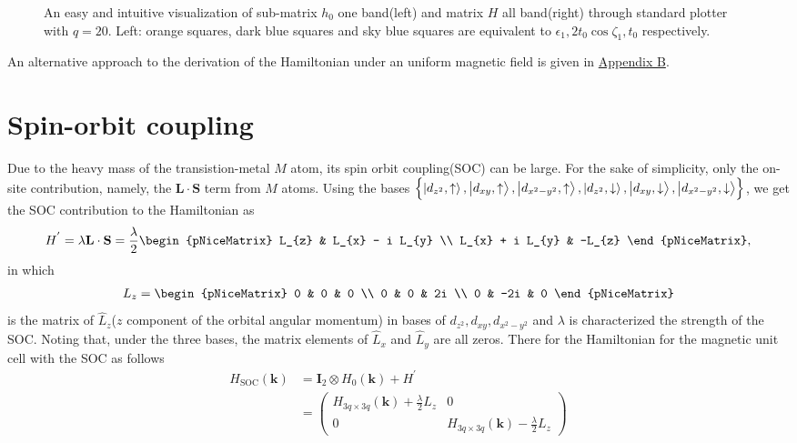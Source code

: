 \documentclass{report}
\newcommand{\f}[2]{\dfrac{#1}{#2}}
\begin{document}
\begin{figure}[htb]
\begin{subfigure}[b]{0.496\textwidth}
		\label{fig:1 band matrix}
	\end{subfigure}
	\caption{
		An easy and intuitive visualization of sub-matrix $h_{0}$ one band(left) and matrix $H$ all band(right) through standard plotter with $q = 20$. Left: orange squares, dark blue squares and sky blue squares are equivalent to $\epsilon_{1}, 2 t_{0} \cos \zeta_{1}, t_{0}$ respectively.
	}
\end{figure}

An alternative approach to the derivation of the Hamiltonian under an uniform magnetic field is given in \hyperref[appendix b]{Appendix B}.

\section{Spin-orbit coupling}
Due to the heavy mass of the transistion-metal $M$ atom, its spin orbit coupling(SOC) can be large. For the sake of simplicity, only the on-site contribution, namely, the $\mathbf{L \cdot S}$ term from $M$ atoms. Using the bases $\left\{\ket{d_{z^{2}},\uparrow},\ket{d_{xy},\uparrow},\ket{d_{x^{2} - y^{2}},\uparrow},\ket{d_{z^{2}},\downarrow},\ket{d_{xy},\downarrow},\ket{d_{x^{2} - y^{2} },\downarrow}\right\}$, we get the SOC contribution to the Hamiltonian as
\begin{gather}
	H^{'}
	= \lambda \mathbf{L \cdot S}
	= \f{\lambda}{2}
	\begin{pNiceMatrix}
		L_{z} & L_{x} - i L_{y}      \\
		L_{x} + i L_{y}     & -L_{z}
	\end{pNiceMatrix},
\end{gather}
in which
\begin{gather}
	L_{z}
	=
	\begin{pNiceMatrix}
		0 & 0   & 0  \\
		0 & 0   & 2i \\
		0 & -2i & 0
	\end{pNiceMatrix}
\end{gather}
is the matrix of $\hat{L}_{z}$($z$ component of the orbital angular momentum) in bases of $d_{z^{2}},d_{xy},d_{x^{2} - y^{2}}$ and $\lambda$ is characterized the strength of the SOC. Noting that, under the three bases, the matrix elements of $\hat{L}_{x}$ and $\hat{L}_{y}$ are all zeros. There for the Hamiltonian for the magnetic unit cell with the SOC as follows
\begin{equation}
	\begin{aligned}
		H_{\text{SOC}}(\mathbf{k})
		 & = \mathbf{I}_{2} \otimes H_{0}(\mathbf{k}) + H^{'} \\
		 & = 
		 \begin{pmatrix}
		 	H_{3q \times 3q}(\mathbf{k}) + \frac{\lambda}{2} L_{z} & 0 \\
		 	0 & H_{3q \times 3q}(\mathbf{k}) - \frac{\lambda}{2} L_{z}
		 \end{pmatrix}
	\end{aligned}
\end{equation}
\end{document}
